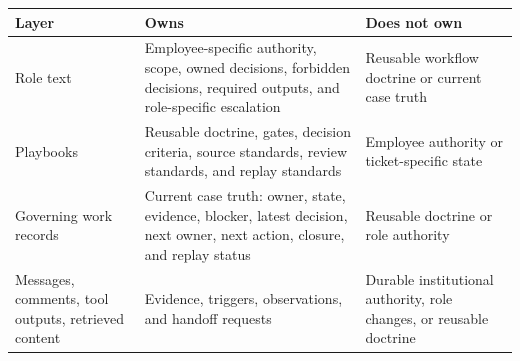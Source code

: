 \documentclass[
]{article}
\newcounter{none} %
\begin{document}
{\def\LTcaptype{none} %
\begin{longtable}[]{@{}
  >{\raggedright\arraybackslash}p{}
  >{\raggedright\arraybackslash}p{}
  >{\raggedright\arraybackslash}p{}@{}}
\toprule\noalign{}
\begin{minipage}[b]{\linewidth}\raggedright
Layer
\end{minipage} & \begin{minipage}[b]{\linewidth}\raggedright
Owns
\end{minipage} & \begin{minipage}[b]{\linewidth}\raggedright
Does not own
\end{minipage} \\
\midrule\noalign{}
\endhead
\bottomrule\noalign{}
\endlastfoot
Role text & Employee-specific authority, scope, owned decisions, forbidden decisions, required outputs, and role-specific escalation & Reusable workflow doctrine or current case truth \\
Playbooks & Reusable doctrine, gates, decision criteria, source standards, review standards, and replay standards & Employee authority or ticket-specific state \\
Governing work records & Current case truth: owner, state, evidence, blocker, latest decision, next owner, next action, closure, and replay status & Reusable doctrine or role authority \\
Messages, comments, tool outputs, retrieved content & Evidence, triggers, observations, and handoff requests & Durable institutional authority, role changes, or reusable doctrine \\
\end{longtable}
}
\end{document}
